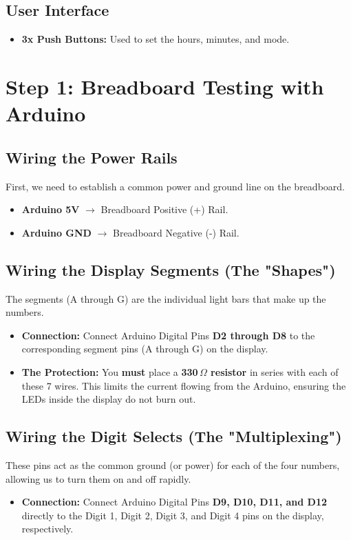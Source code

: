 \documentclass[11pt,a4paper]{article}
\begin{document}
\subsection*{User Interface}
\begin{itemize}
    \item \textbf{3x Push Buttons:} Used to set the hours, minutes, and mode.
\end{itemize}
\newpage
\section{Step 1: Breadboard Testing with Arduino}

\subsection*{Wiring the Power Rails}
First, we need to establish a common power and ground line on the breadboard.
\begin{itemize}
    \item \textbf{Arduino 5V} $\rightarrow$ Breadboard Positive (+) Rail.
    \item \textbf{Arduino GND} $\rightarrow$ Breadboard Negative (-) Rail.
\end{itemize}

\subsection*{Wiring the Display Segments (The "Shapes")}
The segments (A through G) are the individual light bars that make up the numbers. 
\begin{itemize}
    \item \textbf{Connection:} Connect Arduino Digital Pins \textbf{D2 through D8} to the corresponding segment pins (A through G) on the display.
    \item \textbf{The Protection:} You \textbf{must} place a \textbf{330\,$\Omega$ resistor} in series with each of these 7 wires. This limits the current flowing from the Arduino, ensuring the LEDs inside the display do not burn out.
\end{itemize}

\subsection*{Wiring the Digit Selects (The "Multiplexing")}
These pins act as the common ground (or power) for each of the four numbers, allowing us to turn them on and off rapidly.
\begin{itemize}
    \item \textbf{Connection:} Connect Arduino Digital Pins \textbf{D9, D10, D11, and D12} directly to the Digit 1, Digit 2, Digit 3, and Digit 4 pins on the display, respectively.
\end{itemize}
\end{document}
